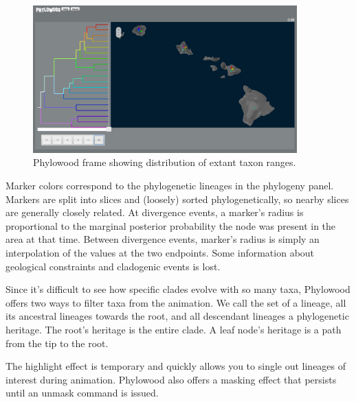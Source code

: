\begin{figure}[H]
\centering
\includegraphics[width=4in]{../RB_Biogeography_Tutorial/figures/phw_all}
\caption{Phylowood frame showing distribution of extant taxon ranges.}
\end{figure}


Marker colors correspond to the phylogenetic lineages in the phylogeny panel.
Markers are split into slices and (loosely) sorted phylogenetically, so nearby slices are generally closely related.
At divergence events, a marker's radius is proportional to the marginal posterior probability the node was present in the area at that time.
Between divergence events, marker's radius is simply an interpolation of the values at the two endpoints.
Some information about geological constraints and cladogenic events is lost.


Since it's difficult to see how specific clades evolve with so many taxa, Phylowood offers two ways to filter taxa from the animation.
We call the set of a lineage, all its ancestral lineages towards the root, and all descendant lineages a phylogenetic heritage.
The root's heritage is the entire clade.
A leaf node's heritage is a path from the tip to the root.


The highlight effect is temporary and quickly allows you to single out lineages of interest during animation.
Phylowood also offers a masking effect that persists until an unmask command is issued.

